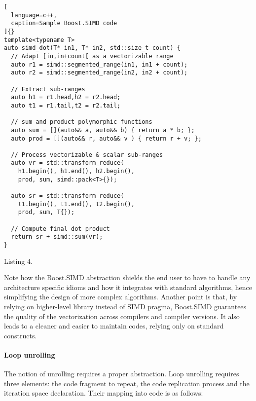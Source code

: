 \documentclass[../main]{subfiles}
\begin{document}
\begin{lstlisting}[
  language=c++,
  caption=Sample Boost.SIMD code
]{}
template<typename T>
auto simd_dot(T* in1, T* in2, std::size_t count) {
  // Adapt [in,in+count[ as a vectorizable range
  auto r1 = simd::segmented_range(in1, in1 + count);
  auto r2 = simd::segmented_range(in2, in2 + count);

  // Extract sub-ranges
  auto h1 = r1.head,h2 = r2.head;
  auto t1 = r1.tail,t2 = r2.tail;

  // sum and product polymorphic functions
  auto sum = [](auto&& a, auto&& b) { return a * b; };
  auto prod = [](auto&& r, auto&& v ) { return r + v; };

  // Process vectorizable & scalar sub-ranges
  auto vr = std::transform_reduce(
    h1.begin(), h1.end(), h2.begin(),
    prod, sum, simd::pack<T>{});

  auto sr = std::transform_reduce(
    t1.begin(), t1.end(), t2.begin(),
    prod, sum, T{});

  // Compute final dot product
  return sr + simd::sum(vr);
}
\end{lstlisting}
Listing 4.

Note how the Boost.SIMD abstraction shields the end
user to have to handle any architecture specific idioms
and how it integrates with standard algorithms, hence
simplifying the design of more complex algorithms.
Another point is that, by relying on higher-level library
instead of SIMD pragma, Boost.SIMD guarantees
the quality of the vectorization across compilers and
compiler versions. It also leads to a cleaner and easier to
maintain codes, relying only on standard \cpp constructs.

\paragraph{Loop unrolling} The notion of unrolling requires
a proper abstraction. Loop unrolling requires three
elements: the code fragment to repeat, the code
replication process and the iteration space declaration.
Their mapping into \cpp code is as follows:
\end{document}
